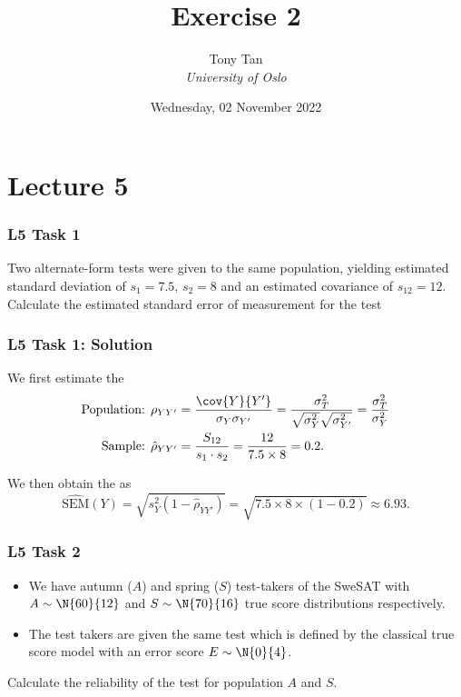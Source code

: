\documentclass[compress]{beamer}\usepackage[]{graphicx}\usepackage[]{xcolor}
\title{Exercise 2}
\author[]{Tony Tan \\\vspace{6pt} {\em{University of Oslo}} }
\date{Wednesday, 02 November 2022}
\begin{document}
\begin{frame}[fragile]
\titlepage
\end{frame}


\section{Lecture 5}

\begin{frame}[fragile]
  \frametitle{L5 Task 1}
    Two alternate-form tests were given to the same population, yielding estimated standard deviation of $s_1 = 7.5$, $s_2 = 8$ and an estimated covariance of $s_{12} = 12$. Calculate the estimated standard error of measurement for the test
\end{frame}


\begin{frame}[fragile]
  \frametitle{L5 Task 1: Solution}
    We first estimate the 
    \begin{equation*}
      \begin{aligned}
        \text{Population: } \rho_{YY'} &= \frac{\cov{Y}{Y'}}{\sigma_Y \sigma_{Y'}} = \frac{\sigma_T^2}{\sqrt{\sigma_Y^2} \sqrt{\sigma_{Y'}^2}} = \frac{\sigma_T^2}{\sigma_Y^2} \\
        \text{Sample: } \hat{\rho}_{YY'} &= \frac{S_{12}}{s_1 \cdot s_2} = \frac{12}{7.5 \times 8} = 0.2.
      \end{aligned}
    \end{equation*}

    We then obtain the  as
      \[ \hat{\text{SEM}} (Y) = \sqrt{s_Y^2 (1 - \hat{\rho}_{YY'})} = \sqrt{7.5 \times 8 \times (1 - 0.2)} \approx 6.93. \]
\end{frame}


\begin{frame}[fragile]
  \frametitle{L5 Task 2}
    \begin{itemize}
      \item We have autumn ($A$) and spring ($S$) test-takers of the SweSAT with $A \sim \N{60}{12}$ and $S \sim \N{70}{16}$ true score distributions respectively.
      \item The test takers are given the same test which is defined by the classical true score model with an error score $E \sim \N{0}{4}$.
    \end{itemize}

    Calculate the reliability of the test for population $A$ and $S$.
\end{frame}
\end{document}
